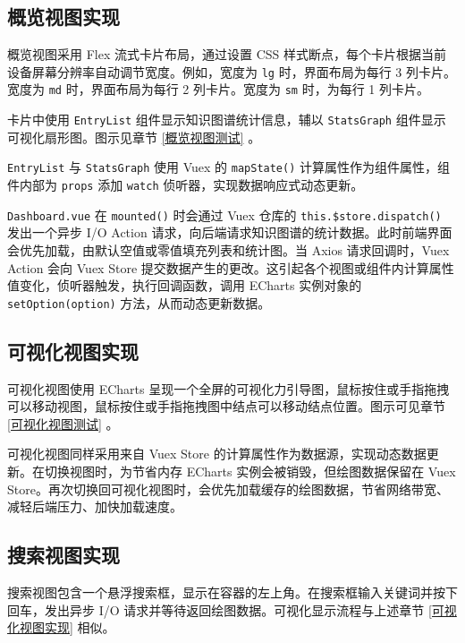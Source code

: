 \documentclass[a4paper,AutoFakeBold,oneside,12pt]{book}
\begin{document}
\subsection{概览视图实现\label{概览视图实现}}

概览视图采用 Flex 流式卡片布局，通过设置 CSS 样式断点，每个卡片根据当前设备屏幕分辨率自动调节宽度。例如，宽度为 \lstinline|lg| 时，界面布局为每行 3 列卡片。宽度为 \lstinline|md| 时，界面布局为每行 2 列卡片。宽度为 \lstinline|sm| 时，为每行 1 列卡片。

卡片中使用 \lstinline|EntryList| 组件显示知识图谱统计信息，辅以 \lstinline|StatsGraph| 组件显示可视化扇形图。图示见章节 \ref{概览视图测试} 。

\lstinline|EntryList| 与 \lstinline|StatsGraph| 使用 Vuex 的 \lstinline|mapState()| 计算属性作为组件属性，组件内部为 \lstinline|props| 添加 \lstinline|watch| 侦听器，实现数据响应式动态更新。

\lstinline|Dashboard.vue| 在 \lstinline|mounted()| 时会通过 Vuex 仓库的 \lstinline|this.$store.dispatch()| 发出一个异步 I/O Action 请求，向后端请求知识图谱的统计数据。此时前端界面会优先加载，由默认空值或零值填充列表和统计图。当 Axios 请求回调时，Vuex Action 会向 Vuex Store 提交数据产生的更改。这引起各个视图或组件内计算属性值变化，侦听器触发，执行回调函数，调用 ECharts 实例对象的 \lstinline|setOption(option)| 方法，从而动态更新数据。

\subsection{可视化视图实现\label{可视化视图实现}}

可视化视图使用 ECharts 呈现一个全屏的可视化力引导图，鼠标按住或手指拖拽可以移动视图，鼠标按住或手指拖拽图中结点可以移动结点位置。图示可见章节 \ref{可视化视图测试} 。

可视化视图同样采用来自 Vuex Store 的计算属性作为数据源，实现动态数据更新。在切换视图时，为节省内存 ECharts 实例会被销毁，但绘图数据保留在 Vuex Store。再次切换回可视化视图时，会优先加载缓存的绘图数据，节省网络带宽、减轻后端压力、加快加载速度。

\subsection{搜索视图实现}

搜索视图包含一个悬浮搜索框，显示在容器的左上角。在搜索框输入关键词并按下回车，发出异步 I/O 请求并等待返回绘图数据。可视化显示流程与上述章节 \ref{可视化视图实现} 相似。
\end{document}
